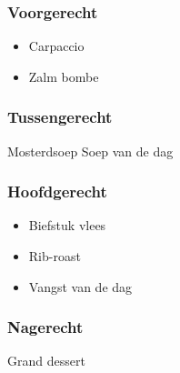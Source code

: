 \subsubsection*{Voorgerecht}
\begin{itemize}
	\item Carpaccio
	\item Zalm bombe
\end{itemize}

\subsubsection*{Tussengerecht}
Mosterdsoep
Soep van de dag

\subsubsection*{Hoofdgerecht}
\begin{itemize}
	\item Biefstuk vlees
	\item Rib-roast
	\item Vangst van de dag
\end{itemize}

\subsubsection*{Nagerecht}
Grand dessert
